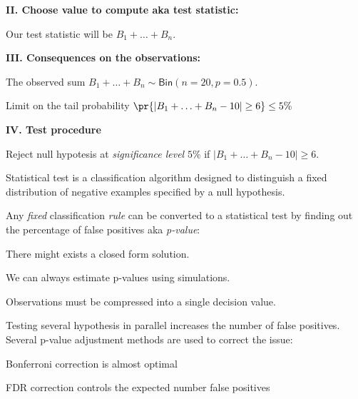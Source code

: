 \documentclass[landscape,footrule]{foils}
\begin{document}
\textbf{II. Choose value to compute aka test statistic:} 
\begin{triangles}
\item Our test statistic will be $B_1+\ldots+B_n$.
\end{triangles}
\vspace*{1cm}


\textbf{III. Consequences on the observations:} 
\begin{triangles}
\item The observed sum $B_1+\ldots+B_n\sim\mathsf{Bin}(n=20, p=0.5)$.
\item Limit on the tail probability $\pr{|B_1+\ldots+B_n-10|\geq 6}\leq 5\%$
\end{triangles}
\vspace*{1cm}

\textbf{IV. Test procedure}
\begin{triangles}
\item Reject null hypotesis at \emph{significance level} $5\%$ if $|B_1+\ldots+B_n-10|\geq 6$.  
\end{triangles}
 
 

Statistical test is a classification algorithm designed to distinguish a fixed distribution of negative examples specified by a null hypothesis.
\vspace*{2ex}

Any \emph{fixed} classification \emph{rule} can be converted to a statistical test by finding out the percentage of false positives aka \emph{p-value}:
\begin{triangles}
\item There might exists a closed form solution.
\item We can always estimate p-values using simulations. 
\item Observations must be compressed into a single decision value.
\end{triangles}
\vspace*{2ex}

Testing several hypothesis in parallel increases the number of false positives.  
Several p-value adjustment methods are used to correct the issue:
\begin{triangles}
\item Bonferroni correction is almost optimal 
\item FDR correction controls the expected number false positives  
\end{triangles}  
 
\end{document}
